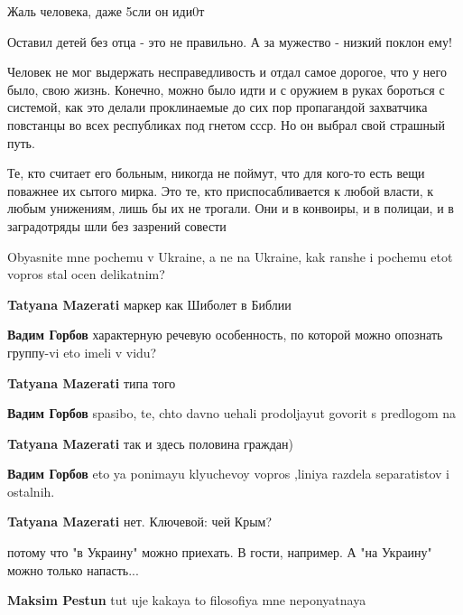 \begin{itemize}
\begin{itemize}
\end{itemize} %

Жаль человека, даже 5сли он иди0т

Оставил детей без отца - это не правильно. А за мужество - низкий поклон ему!


Человек не мог выдержать несправедливость и отдал самое дорогое, что у него
было, свою жизнь. Конечно, можно было идти и с оружием в руках бороться с
системой, как это делали проклинаемые до сих пор пропагандой захватчика
повстанцы во всех республиках под гнетом ссср. Но он выбрал свой страшный путь.

Те, кто считает его больным, никогда не поймут, что для кого-то есть вещи
поважнее их сытого мирка. Это те, кто приспосабливается к любой власти, к любым
унижениям, лишь бы их не трогали. Они и в конвоиры, и в полицаи, и в
заградотряды шли без зазрений совести


Obyasnite mne pochemu v Ukraine, a ne na Ukraine, kak ranshe i pochemu etot vopros stal ocen delikatnim?

\begin{itemize} %
\textbf{Tatyana Mazerati} маркер как Шиболет в Библии

\begin{itemize} %
\textbf{Вадим Горбов} характерную речевую особенность, по которой можно опознать группу-vi eto imeli v vidu?

\textbf{Tatyana Mazerati} типа того

\textbf{Вадим Горбов} spasibo, te, chto davno uehali prodoljayut govorit s predlogom na

\textbf{Tatyana Mazerati} так и здесь половина граждан)

\textbf{Вадим Горбов} eto ya ponimayu klyuchevoy vopros ,liniya razdela separatistov i ostalnih.

\textbf{Tatyana Mazerati} нет. Ключевой: чей Крым?
\end{itemize} %

потому что "в Украину" можно приехать. В гости, например. А "на Украину" можно только напасть...

\begin{itemize} %
\textbf{Maksim Pestun} tut uje kakaya to filosofiya mne neponyatnaya


\end{itemize}
\end{itemize}
\end{itemize}
